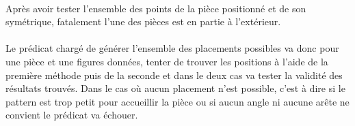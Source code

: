 \documentclass{report}
\begin{document}
    \paragraph{} Après avoir tester l'ensemble des points de la pièce positionné et de son
    symétrique, fatalement l'une des pièces est en partie à l'extérieur.

    \paragraph{} Le prédicat chargé de générer l'ensemble des placements possibles va donc pour une
    pièce et une figures données, tenter de trouver les positions à l'aide de la première méthode
    puis de la seconde et dans le deux cas va tester la validité des résultats trouvés.
    Dans le cas où aucun placement n'est possible, c'est à dire si le pattern est trop petit pour
    accueillir la pièce ou si aucun angle ni aucune arête ne convient le prédicat va échouer.
\end{document}
